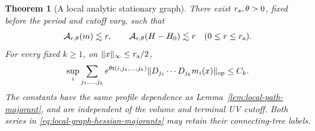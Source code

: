 \documentclass[11pt,reqno]{amsart}
\numberwithin{equation}{section}
\newtheorem{theorem}{Theorem}[section]
\theoremstyle{definition}
\theoremstyle{remark}
\begin{document}
\begin{theorem}[A local analytic stationary graph]
\label{thm:local-analytic-graph}
There exist \(r_{\rm a},\theta>0\), fixed
before the period and cutoff vary, such that
\begin{equation}
 \mathcal A_{r,\theta}(m)\lesssim r,\qquad
 \mathcal A_{r,\theta}(H-H_0)\lesssim r
                   \quad(0\le r\le r_{\rm a}).
 \label{eq:local-graph-hessian-majorants}
\end{equation}
For every fixed \(k\ge1\), on
\(\|x\|_\infty\le r_{\rm a}/2\),
\begin{equation}
 \sup_i\sum_{j_1,\ldots,j_k}
 e^{\theta\mathsf t(i,j_1,\ldots,j_k)}
       \|D_{j_1}\cdots D_{j_k}m_i(x)\|_{\rm op}
                                                     \le C_k.
 \label{eq:local-graph-response}
\end{equation}
The constants have the same profile dependence as
Lemma~\ref{lem:local-path-majorant}, and are independent
of the volume and terminal UV cutoff.
Both series in \eqref{eq:local-graph-hessian-majorants}
may retain their connecting-tree labels.
\end{theorem}
\end{document}
